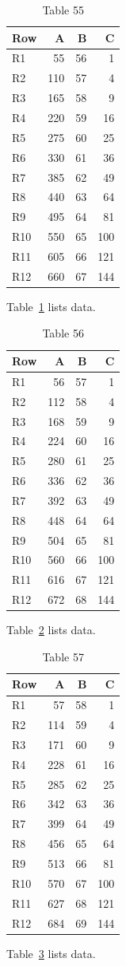 \documentclass[10pt]{article}
\begin{document}
\begin{table}[ht]\centering\caption{Table 55}\label{tab:55}\begin{tabular}{lrrr}\toprule Row&A&B&C\\\midrule
R1&55&56&1\\
R2&110&57&4\\
R3&165&58&9\\
R4&220&59&16\\
R5&275&60&25\\
R6&330&61&36\\
R7&385&62&49\\
R8&440&63&64\\
R9&495&64&81\\
R10&550&65&100\\
R11&605&66&121\\
R12&660&67&144\\
\bottomrule\end{tabular}\end{table} Table~\ref{tab:55} lists data.
\begin{table}[ht]\centering\caption{Table 56}\label{tab:56}\begin{tabular}{lrrr}\toprule Row&A&B&C\\\midrule
R1&56&57&1\\
R2&112&58&4\\
R3&168&59&9\\
R4&224&60&16\\
R5&280&61&25\\
R6&336&62&36\\
R7&392&63&49\\
R8&448&64&64\\
R9&504&65&81\\
R10&560&66&100\\
R11&616&67&121\\
R12&672&68&144\\
\bottomrule\end{tabular}\end{table} Table~\ref{tab:56} lists data.
\begin{table}[ht]\centering\caption{Table 57}\label{tab:57}\begin{tabular}{lrrr}\toprule Row&A&B&C\\\midrule
R1&57&58&1\\
R2&114&59&4\\
R3&171&60&9\\
R4&228&61&16\\
R5&285&62&25\\
R6&342&63&36\\
R7&399&64&49\\
R8&456&65&64\\
R9&513&66&81\\
R10&570&67&100\\
R11&627&68&121\\
R12&684&69&144\\
\bottomrule\end{tabular}\end{table} Table~\ref{tab:57} lists data.
\end{document}
